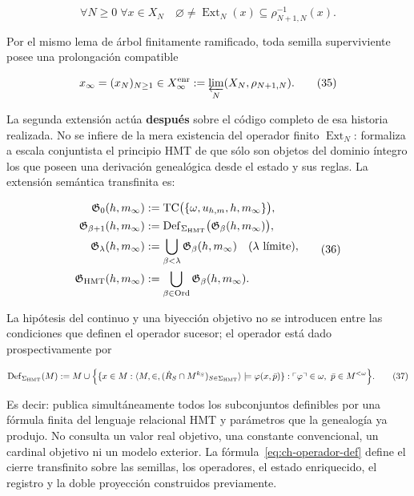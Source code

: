 \[
 \forall N\ge0\;\forall x\in X_N\quad
 \varnothing\ne\operatorname{Ext}_N(x)
 \subseteq\rho_{N+1,N}^{-1}(x).
\tag{34}\label{eq:ch-extension-no-vacia}
\]

Por el mismo lema de árbol finitamente ramificado, toda semilla superviviente
posee una prolongación compatible

\[
 x_\infty=(x_N)_{N\ge1}\in
 X_\infty^{\rm enr}:=\varprojlim_N(X_N,\rho_{N+1,N}).
\tag{35}\label{eq:ch-limite-inverso}
\]

La segunda extensión actúa \textbf{después} sobre el código completo de esa
historia realizada.
No se infiere de la mera existencia del operador finito
\(\operatorname{Ext}_N\): formaliza a escala conjuntista el principio HMT de
que sólo son objetos del dominio íntegro los que poseen una derivación
genealógica desde el estado y sus reglas. La extensión semántica transfinita
es:

\[
 \begin{aligned}
  \mathfrak G_0(h,m_\infty)
  &:=\operatorname{TC}\bigl(\{\omega,u_{h,m},h,m_\infty\}\bigr),\\
  \mathfrak G_{\beta+1}(h,m_\infty)
  &:=\operatorname{Def}_{\Sigma_{\rm HMT}}
       \bigl(\mathfrak G_\beta(h,m_\infty)\bigr),\\
  \mathfrak G_\lambda(h,m_\infty)
  &:=\bigcup_{\beta<\lambda}\mathfrak G_\beta(h,m_\infty)
       \quad(\lambda\text{ límite}),\\
  \mathfrak G_{\rm HMT}(h,m_\infty)
  &:=\bigcup_{\beta\in\operatorname{Ord}}
       \mathfrak G_\beta(h,m_\infty).
 \end{aligned}
\tag{36}\label{eq:ch-clausura-transfinita}
\]

La hipótesis del continuo y una biyección objetivo no se introducen entre las
condiciones que definen el operador sucesor; el operador está dado
prospectivamente por

\[
 \operatorname{Def}_{\Sigma_{\rm HMT}}(M)
 :=M\cup
 \Bigl\{
   \{x\in M:\langle M,\in,
       (\dot R_S\cap M^{k_S})_{S\in\Sigma_{\rm HMT}}\rangle
       \models\varphi(x,\bar p)\}:
   \ulcorner\varphi\urcorner\in\omega,
   \ \bar p\in M^{<\omega}
 \Bigr\}.
\tag{37}\label{eq:ch-operador-def}
\]

Es decir: publica simultáneamente todos los subconjuntos definibles por una
fórmula finita del lenguaje relacional HMT y parámetros que la genealogía ya
produjo. No
consulta un valor real objetivo, una constante convencional, un cardinal
objetivo ni un modelo exterior. La fórmula~\eqref{eq:ch-operador-def} define el cierre transfinito
sobre las semillas, los operadores, el estado enriquecido, el registro y la
doble proyección construidos previamente.

